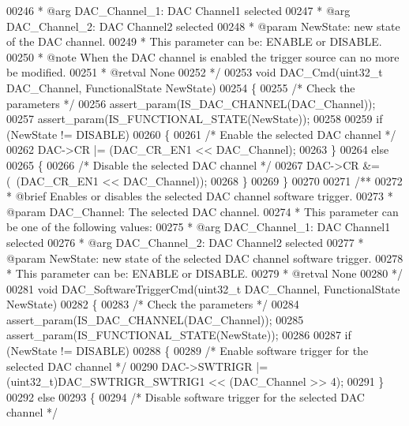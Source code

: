 \begin{DoxyCode}
00246 \textcolor{comment}{  *            @arg DAC\_Channel\_1: DAC Channel1 selected}
00247 \textcolor{comment}{  *            @arg DAC\_Channel\_2: DAC Channel2 selected}
00248 \textcolor{comment}{  * @param  NewState: new state of the DAC channel. }
00249 \textcolor{comment}{  *          This parameter can be: ENABLE or DISABLE.}
00250 \textcolor{comment}{  * @note   When the DAC channel is enabled the trigger source can no more be modified.}
00251 \textcolor{comment}{  * @retval None}
00252 \textcolor{comment}{  */}
00253 \textcolor{keywordtype}{void} DAC_Cmd(uint32\_t DAC\_Channel, FunctionalState NewState)
00254 \{
00255   \textcolor{comment}{/* Check the parameters */}
00256   assert_param(IS\_DAC\_CHANNEL(DAC\_Channel));
00257   assert_param(IS\_FUNCTIONAL\_STATE(NewState));
00258 
00259   \textcolor{keywordflow}{if} (NewState != DISABLE)
00260   \{
00261     \textcolor{comment}{/* Enable the selected DAC channel */}
00262     DAC->CR |= (DAC_CR_EN1 << DAC\_Channel);
00263   \}
00264   \textcolor{keywordflow}{else}
00265   \{
00266     \textcolor{comment}{/* Disable the selected DAC channel */}
00267     DAC->CR &= (~(DAC_CR_EN1 << DAC\_Channel));
00268   \}
00269 \}
00270 
00271 \textcolor{comment}{/**}
00272 \textcolor{comment}{  * @brief  Enables or disables the selected DAC channel software trigger.}
00273 \textcolor{comment}{  * @param  DAC\_Channel: The selected DAC channel. }
00274 \textcolor{comment}{  *          This parameter can be one of the following values:}
00275 \textcolor{comment}{  *            @arg DAC\_Channel\_1: DAC Channel1 selected}
00276 \textcolor{comment}{  *            @arg DAC\_Channel\_2: DAC Channel2 selected}
00277 \textcolor{comment}{  * @param  NewState: new state of the selected DAC channel software trigger.}
00278 \textcolor{comment}{  *          This parameter can be: ENABLE or DISABLE.}
00279 \textcolor{comment}{  * @retval None}
00280 \textcolor{comment}{  */}
00281 \textcolor{keywordtype}{void} DAC_SoftwareTriggerCmd(uint32\_t DAC\_Channel, FunctionalState NewState)
00282 \{
00283   \textcolor{comment}{/* Check the parameters */}
00284   assert_param(IS\_DAC\_CHANNEL(DAC\_Channel));
00285   assert_param(IS\_FUNCTIONAL\_STATE(NewState));
00286 
00287   \textcolor{keywordflow}{if} (NewState != DISABLE)
00288   \{
00289     \textcolor{comment}{/* Enable software trigger for the selected DAC channel */}
00290     DAC->SWTRIGR |= (uint32\_t)DAC_SWTRIGR_SWTRIG1 << (DAC\_Channel >> 4);
00291   \}
00292   \textcolor{keywordflow}{else}
00293   \{
00294     \textcolor{comment}{/* Disable software trigger for the selected DAC channel */}

\end{DoxyCode}
